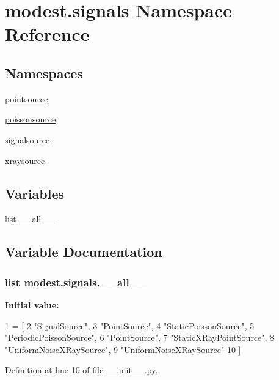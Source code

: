 \hypertarget{namespacemodest_1_1signals}{}\section{modest.\+signals Namespace Reference}
\label{namespacemodest_1_1signals}
\subsection*{Namespaces}
\begin{DoxyCompactItemize}
\item 
 \hyperlink{namespacemodest_1_1signals_1_1pointsource}{pointsource}
\item 
 \hyperlink{namespacemodest_1_1signals_1_1poissonsource}{poissonsource}
\item 
 \hyperlink{namespacemodest_1_1signals_1_1signalsource}{signalsource}
\item 
 \hyperlink{namespacemodest_1_1signals_1_1xraysource}{xraysource}
\end{DoxyCompactItemize}
\subsection*{Variables}
\begin{DoxyCompactItemize}
\item 
list \hyperlink{namespacemodest_1_1signals_aa31151680eba696b8f6eb7877a67adac}{\+\_\+\+\_\+all\+\_\+\+\_\+}
\end{DoxyCompactItemize}


\subsection{Variable Documentation}
\subsubsection[{\texorpdfstring{\+\_\+\+\_\+all\+\_\+\+\_\+}{__all__}}]{\setlength{\rightskip}{0pt plus 5cm}list modest.\+signals.\+\_\+\+\_\+all\+\_\+\+\_\+\hspace{0.3cm}{\ttfamily [private]}}\hypertarget{namespacemodest_1_1signals_aa31151680eba696b8f6eb7877a67adac}{}\label{namespacemodest_1_1signals_aa31151680eba696b8f6eb7877a67adac}
{\bfseries Initial value\+:}
\begin{DoxyCode}
1 = [
2     \textcolor{stringliteral}{"SignalSource"},
3     \textcolor{stringliteral}{"PointSource"},
4     \textcolor{stringliteral}{"StaticPoissonSource"},
5     \textcolor{stringliteral}{"PeriodicPoissonSource"},
6     \textcolor{stringliteral}{"PointSource"},
7     \textcolor{stringliteral}{"StaticXRayPointSource"},
8     \textcolor{stringliteral}{"UniformNoiseXRaySource"},
9     \textcolor{stringliteral}{"UniformNoiseXRaySource"}    
10 ]
\end{DoxyCode}


Definition at line 10 of file \+\_\+\+\_\+init\+\_\+\+\_\+.\+py.

